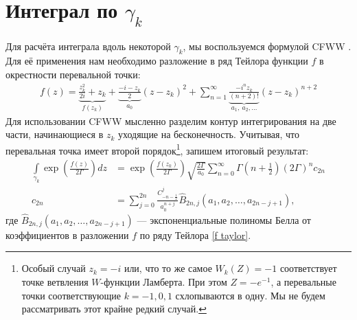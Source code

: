 \documentclass[a4paper, 12pt]{article}
\newenvironment{eqw}{\begin{equation} \begin{aligned}}   
    {\end{aligned}    \end{equation}}
\begin{document}
\section*{Интеграл по $\gamma_k$}
Для расчёта интеграла вдоль некоторой $\gamma_k$, мы воспользуемся формулой CFWW \cite{bleistein1975asymptotic}. Для её применения нам необходимо разложение в ряд Тейлора функции $f$ в окрестности перевальной точки:
\begin{eqw}\label{f taylor}
    f(z) = \underbrace{\frac{z_k^2}{2i} + z_k}_{f(z_k)} + \underbrace{\frac{-i-z_k}{2}}_{a_0} (z-z_k)^2 + 
    \sum_{n=1}^{\infty} \underbrace{\frac{-i^n z_k}{(n+2)!}}_{a_1, \: a_2, \dots} (z-z_k)^{n+2}
\end{eqw}
Для использовании CFWW мысленно разделим контур интегрирования на две части, начинающиеся в $z_k$ уходящие на бесконечность. Учитывая, что перевальная точка имеет второй порядок\footnote{Особый случай $z_k = -i$ или, что то же самое $W_k(Z) = -1$ соответствует точке ветвления $W$-функции Ламберта. При этом $Z=-e^{-1}$, а перевальные точки соответствующие $k=-1, 0, 1$ схлопываются в одну. Мы не будем рассматривать этот крайне редкий случай.}, запишем итоговый результат:
\begin{eqw}\label{asymptotic gamma_k int raw}
    \int\limits_{\gamma_k} \exp\left(\frac{f(z)}{2\Gamma}\right) dz 
    &= \exp\left(\frac{ f(z_k)}{2\Gamma} \right)\sqrt{\frac{2\Gamma}{a_0}}\sum\limits_{n=0}^{\infty} 
    \Gamma\left(n+\frac{1}{2}\right)\left(2\Gamma\right)^n c_{2n}\\
    c_{2n} &= \sum\limits_{j=0}^{2n} \frac{C_{-n-\frac{1}{2}}^j}{a_0^{n+j}}\hat{B}_{2n, j}\left(a_1, a_2, \dots, a_{2n-j+1}\right),
\end{eqw}
где $\hat{B}_{2n, j}\left(a_1, a_2, \dots, a_{2n-j+1}\right)$ --- экспоненциальные полиномы Белла от коэффициентов в разложении  $f$ по ряду Тейлора \eqref{f taylor}. 
\end{document}
